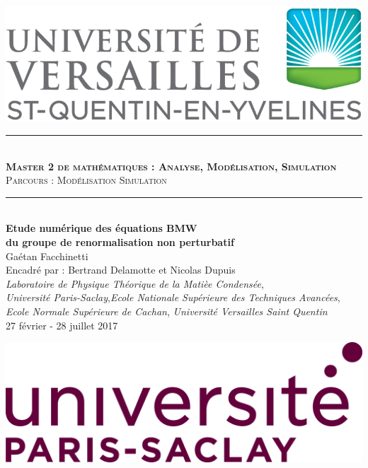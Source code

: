 \documentclass[10pt]{article}
\begin{document}
\begin{center}
\hspace*{20pt}
\includegraphics[scale=0.15]{Logo_Versailles.png}
\\
\vspace*{20pt}
\rule{10cm}{1pt}
\vspace*{10pt} \\
\textsc{\textbf{{\large Master 2 de mathématiques : Analyse, Modélisation, Simulation}}\\
 Parcours : Modélisation Simulation}\\
\rule{10cm}{1pt}
\vspace*{20pt} \\
\textbf{\Large Etude numérique des équations \og BMW \fg{} \\ du groupe de renormalisation non perturbatif}\\
\vspace*{10pt}
Gaétan Facchinetti \\
Encadré par : Bertrand Delamotte  et Nicolas Dupuis
{ \\
\vspace*{15pt}
\textit{Laboratoire de Physique Théorique de la Matièe Condensée},\\
\vspace*{5pt}
\textit{Université Paris-Saclay},\textit{Ecole Nationale Supérieure des Techniques Avancées}, \\
\textit{Ecole Normale Supérieure de Cachan}, \textit{Université Versailles Saint Quentin}}\\
\vspace*{20pt}
{\small 27 février - 28 juillet 2017 }

\end{center}


\vfill
\hfill
\includegraphics[scale=0.25]{parisSaclay.jpg}
\pagebreak
\end{document}
